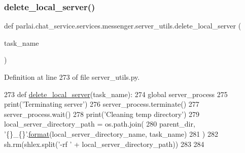 \mbox{\label{namespaceparlai_1_1chat__service_1_1services_1_1messenger_1_1server__utils_a94445c358161efa9329ecbeefadb01dc}} 
\subsubsection{\texorpdfstring{delete\+\_\+local\+\_\+server()}{delete\_local\_server()}}
{\footnotesize\ttfamily def parlai.\+chat\+\_\+service.\+services.\+messenger.\+server\+\_\+utils.\+delete\+\_\+local\+\_\+server (\begin{DoxyParamCaption}\item[{}]{task\+\_\+name }\end{DoxyParamCaption})}



Definition at line 273 of file server\+\_\+utils.\+py.


\begin{DoxyCode}
273 \textcolor{keyword}{def }\hyperlink{namespaceparlai_1_1mturk_1_1core_1_1server__utils_a9b4f4c3f696be001c2fa96b3690af83c}{delete\_local\_server}(task\_name):
274     \textcolor{keyword}{global} server\_process
275     print(\textcolor{stringliteral}{'Terminating server'})
276     server\_process.terminate()
277     server\_process.wait()
278     print(\textcolor{stringliteral}{'Cleaning temp directory'})
279     local\_server\_directory\_path = os.path.join(
280         parent\_dir, \textcolor{stringliteral}{'\{\}\_\{\}'}.\hyperlink{namespaceparlai_1_1chat__service_1_1services_1_1messenger_1_1shared__utils_a32e2e2022b824fbaf80c747160b52a76}{format}(local\_server\_directory\_name, task\_name)
281     )
282     sh.rm(shlex.split(\textcolor{stringliteral}{'-rf '} + local\_server\_directory\_path))
283 
284 
\end{DoxyCode}
\mbox{\label{namespaceparlai_1_1chat__service_1_1services_1_1messenger_1_1server__utils_a0dd350cc27da7cfdc225f8daf19d5e57}} 
